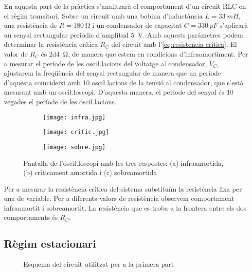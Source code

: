 En aquesta part de la pràctica s'analitzarà el comportament d'un circuit RLC en el règim transitori. Sobre un circuit amb una bobina d'inductància \( L = \SI{33}{mH} \), una resistència de \( R = \SI{180}{\ohm} \) i un condensador de capacitat \( C  = \SI{330}{pF} \) s'aplicarà un senyal rectangular periòdic d'amplitud \SI{5}{V}. Amb aquests paràmetres podem determinar la resistència crítica \( R_C \) del circuit amb l'\cref{eq:resistencia critica}. El valor de \( R_C \) és \SI{2d4}{\ohm}, de manera que estem en condicions d'infraamortiment. Per a mesurar el període de les osci\l.lacions del voltatge al condensador, \( V_C \), ajustarem la freqüència del senyal rectangular de manera que un període d'aquesta coincideixi amb 10 osci\l.lacions de la tensió al condensador, que s'està mesurant amb un osci\l.loscopi. D'aquesta manera, el període del senyal és 10 vegades el període de les osci\l.lacions.

\begin{figure}[htb]
	\centering \small \sffamily

	\begin{subfigure}[b]{0.3\textwidth}
		\texttt{[image: infra.jpg]}
		\caption{}
	\end{subfigure}
	\begin{subfigure}[b]{0.3\textwidth}
		\texttt{[image: critic.jpg]}
		\caption{}
	\end{subfigure}
	\begin{subfigure}[b]{0.3\textwidth}
		\texttt{[image: sobre.jpg]}
		\caption{}
	\end{subfigure}

	\caption{Pantalla de l'osci\l.loscopi amb les tres respostes: (a) infraamortida, (b) críticament amortida i (c) sobreamortida}
	\label{fig:respostes}
\end{figure}

Per a mesurar la resistència crítica del sistema substituïm la resistència fixa per una de variable. Per a diferents valors de resistència observem comportament infraamortit i sobreamortit. La resistència que es troba a la frontera entre els dos comportaments és \( R_C \).  

\subsection{Règim estacionari}
\begin{figure}[htb]
	\centering \small \sffamily
	
	\caption{Esquema del circuit utilitzat per a la primera part}
	\label{fig:esquema estacionari}
\end{figure}

